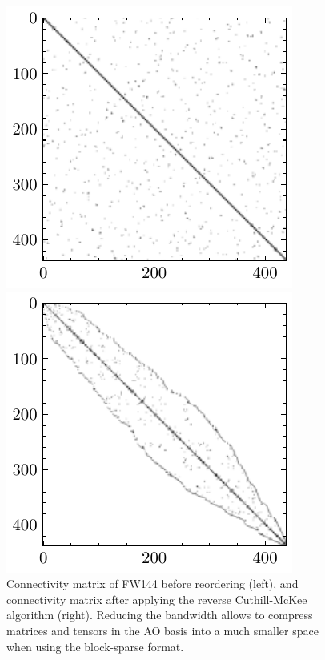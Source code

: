 \begin{figure}
\centering
\begin{minipage}{0.45\textwidth}
\centering
\includegraphics[width=\textwidth]{Pics/FW144_UNORDERED}
\end{minipage}
\begin{minipage}{0.45\textwidth}
\centering
\includegraphics[width=\textwidth]{Pics/FW144_ORDERED}
\end{minipage}
\caption[Illustration of the Cuthill-McKee algorithm]{Connectivity matrix of FW144 before reordering (left), and connectivity matrix after applying the reverse Cuthill-McKee algorithm (right). Reducing the bandwidth allows to compress matrices and tensors in the AO basis into a much smaller space when using the block-sparse format.}
\label{fig:RCM}
\end{figure}

